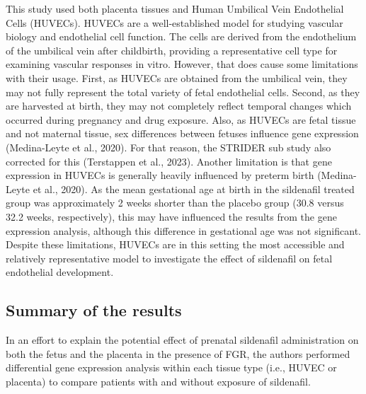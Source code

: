 \documentclass[authordate, reflection,issue]{jote-new-article}
\begin{document}
	This study used both placenta tissues and Human Umbilical Vein Endothelial Cells (HUVECs). HUVECs are a well-established model for studying vascular biology and endothelial cell function. The cells are derived from the endothelium of the umbilical vein after childbirth, providing a representative cell type for examining vascular responses in vitro. However, that does cause some limitations with their usage. First, as HUVECs are obtained from the umbilical vein, they may not fully represent the total variety of fetal endothelial cells. Second, as they are harvested at birth, they may not completely reflect temporal changes which occurred during pregnancy and drug exposure. Also, as HUVECs are fetal tissue and not maternal tissue, sex differences between fetuses influence gene expression (Medina-Leyte et al., 2020).\textsuperscript{ }For that reason, the STRIDER sub study also corrected for this (Terstappen et al., 2023). Another limitation is that gene expression in HUVECs is generally heavily influenced by preterm birth (Medina-Leyte et al., 2020).\textsuperscript{ }As the mean gestational age at birth in the sildenafil treated group was approximately 2 weeks shorter than the placebo group (30.8 versus 32.2 weeks, respectively), this may have influenced the results from the gene expression analysis, although this difference in gestational age was not significant. Despite these limitations, HUVECs are in this setting the most accessible and relatively representative model to investigate the effect of sildenafil on fetal endothelial development.







	\subsection{Summary of the results}



	In an effort to explain the potential effect of prenatal sildenafil administration on both the fetus and the placenta in the presence of FGR, the authors performed differential gene expression analysis within each tissue type (i.e., HUVEC or placenta) to compare patients with and without exposure of sildenafil.
\end{document}
